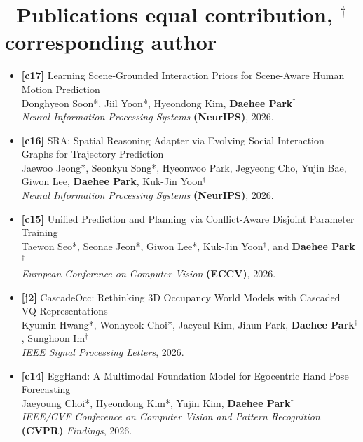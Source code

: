 \documentclass[a4paper,11pt]{article}
\begin{document}
\section{\texorpdfstring{\faBook\ Publications \hfill \textnormal{\footnotesize * equal contribution, $^\dagger$ corresponding author}}{Publications}}
\begin{itemize}[leftmargin=0.25cm]

\item \textbf{[c17]} Learning Scene-Grounded Interaction Priors for Scene-Aware Human Motion Prediction\\
Donghyeon Soon*, Jiil Yoon*, Hyeondong Kim, \textbf{Daehee Park}$^\dagger$\\
\textit{Neural Information Processing Systems} \textbf{(NeurIPS)}, 2026.

\item \textbf{[c16]} SRA: Spatial Reasoning Adapter via Evolving Social Interaction Graphs for Trajectory Prediction\\
Jaewoo Jeong*, Seonkyu Song*, Hyeonwoo Park, Jegyeong Cho, Yujin Bae, Giwon Lee, \textbf{Daehee Park}, Kuk-Jin Yoon$^\dagger$\\
\textit{Neural Information Processing Systems} \textbf{(NeurIPS)}, 2026.

\item \textbf{[c15]} Unified Prediction and Planning via Conflict-Aware Disjoint Parameter Training\\
Taewon Seo*, Seonae Jeon*, Giwon Lee*, Kuk-Jin Yoon$^\dagger$, and \textbf{Daehee Park}$^\dagger$\\
\textit{European Conference on Computer Vision} \textbf{(ECCV)}, 2026.

\item \textbf{[j2]} CascadeOcc: Rethinking 3D Occupancy World Models with Cascaded VQ Representations\\
Kyumin Hwang*, Wonhyeok Choi*, Jaeyeul Kim, Jihun Park, \textbf{Daehee Park}$^\dagger$, Sunghoon Im$^\dagger$\\
\textit{IEEE Signal Processing Letters}, 2026.

\item \textbf{[c14]} EggHand: A Multimodal Foundation Model for Egocentric Hand Pose Forecasting\\
Jaeyoung Choi*, Hyeondong Kim*, Yujin Kim, \textbf{Daehee Park$^\dagger$}\\
\textit{IEEE/CVF Conference on Computer Vision and Pattern Recognition} \textbf{(CVPR)} \textit{Findings}, 2026.


\end{itemize}
\end{document}
